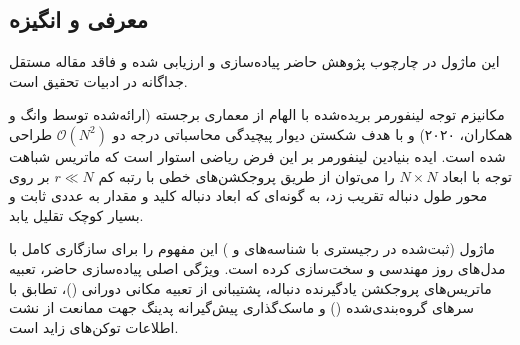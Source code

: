 \subsection{معرفی و انگیزه}
این ماژول در چارچوب پژوهش حاضر پیاده‌سازی و ارزیابی شده و فاقد مقاله مستقل جداگانه در ادبیات تحقیق است.

مکانیزم توجه لینفورمر بریده‌شده  با الهام از معماری برجسته  (ارائه‌شده توسط وانگ و همکاران، ۲۰۲۰) و با هدف شکستن دیوار پیچیدگی محاسباتی درجه دو $\mathcal{O}(N^2)$ طراحی شده است. ایده بنیادین لینفورمر بر این فرض ریاضی استوار است که ماتریس شباهت توجه با ابعاد $N \times N$ را می‌توان از طریق پروجکشن‌های خطی با رتبه کم $r \ll N$ بر روی محور طول دنباله تقریب زد، به گونه‌ای که ابعاد دنباله کلید و مقدار به عددی ثابت و بسیار کوچک تقلیل یابد.

ماژول  (ثبت‌شده در رجیستری با شناسه‌های  و ) این مفهوم را برای سازگاری کامل با مدل‌های روز مهندسی و سخت‌سازی کرده است. ویژگی اصلی پیاده‌سازی حاضر، تعبیه ماتریس‌های پروجکشن یادگیرنده دنباله، پشتیبانی از تعبیه مکانی دورانی ()، تطابق با سرهای گروه‌بندی‌شده () و ماسک‌گذاری پیش‌گیرانه پدینگ جهت ممانعت از نشت اطلاعات توکن‌های زاید است.
